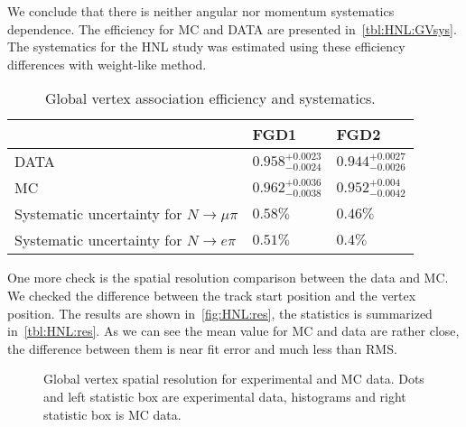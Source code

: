 \documentclass[../main.tex]{subfiles}
\begin{document}
We conclude that there is neither angular nor momentum systematics dependence. The efficiency for MC and DATA are presented in~\autoref{tbl:HNL:GVsys}. The systematics for the HNL study was estimated using these efficiency differences with weight-like method.
\begin{table}[!ht]
\begin{center}
\begin{tabular}{|l|l|l|}
    \hline
    & FGD1 & FGD2 \\
    \hline
    DATA   & $0.958^{+0.0023}_{-0.0024}$ & $0.944^{+0.0027}_{-0.0026}$  \\
    \hline
    MC      & $0.962^{+0.0036}_{-0.0038}$ & $0.952^{+0.004}_{-0.0042}$  \\
    \hline
    Systematic uncertainty for $N\to\mu\pi$ & $0.58\%$ & $0.46\%$ \\
    \hline
    Systematic uncertainty for $N\to e\pi$ & $0.51\%$ & $0.4\%$ \\
    \hline

\end{tabular}
\caption{Global vertex association efficiency and systematics.}
\label{tbl:HNL:GVsys}
\end{center}
\end{table}
One more check is the spatial resolution comparison between the data and MC. We checked the difference between the track start position and the vertex position. The results are shown in~\autoref{fig:HNL:res}, the statistics is summarized in~\autoref{tbl:HNL:res}. As we can see the mean value for MC and data are rather close, the difference between them is near fit error and much less than RMS.
\begin{figure}[!ht]
\begin{center}
    \begin{minipage}{0.49\linewidth}
    \end{minipage}
    \hfill
    \begin{minipage}{0.49\linewidth}
    \end{minipage}
    \vfill
    \begin{minipage}{0.49\linewidth}
    \end{minipage}
    \caption{Global vertex spatial resolution for experimental and MC data. Dots and left statistic box are experimental data, histograms and right statistic box is MC data.}
    \label{fig:HNL:res}
\end{center}
\end{figure}
\end{document}

